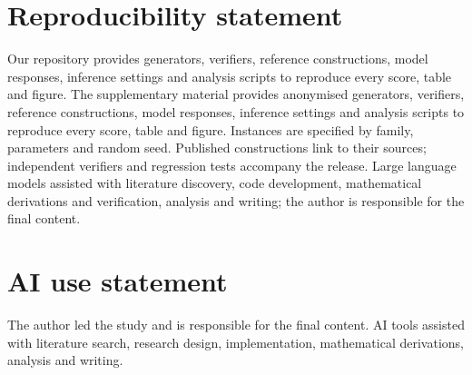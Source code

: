 \documentclass{article}
\begin{document}
\section*{Reproducibility statement}
\ifdefined\EndlessExamPreprint
Our repository provides generators, verifiers, reference constructions, model responses, inference settings and analysis scripts to reproduce every score, table and figure.
\else
The supplementary material provides anonymised generators, verifiers, reference constructions, model responses, inference settings and analysis scripts to reproduce every score, table and figure.
\fi Instances are specified by family, parameters and random seed. Published constructions link to their sources; independent verifiers and regression tests accompany the release.
\ifdefined\EndlessExamPreprint
Large language models assisted with literature discovery, code development, mathematical derivations and verification, analysis and writing; the author is responsible for the final content.
\else
\section*{AI use statement}
The author led the study and is responsible for the final content. AI tools assisted with literature search, research design, implementation, mathematical derivations, analysis and writing.
\fi




\clearpage
\appendix

\end{document}
